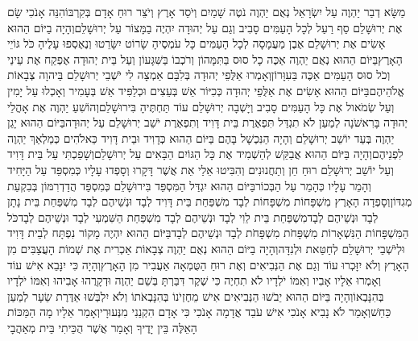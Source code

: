 \documentclass[../main/main.tex]{subfiles}
\begin{document}
\begin{multicols*}{\ncols}
מַשָּׂא דְבַר יַהְוֶה עַל יִשְׂרָאֵל נְאֻם יַהְוֶה נֹטֶה שָׁמַיִם וְיֹסֵד אָרֶץ וְיֹצֵר רוּחַ אָדָם בְּקִרְבּוֹ\PreVerseSpace{}הִנֵּה אָנֹכִי שָׂם אֶת יְרוּשָׁלֵם סַף רַעַל לְכָל הָעַמִּים סָבִיב וְגַם עַל יְהוּדָה יִהְיֶה בַמָּצוֹר עַל יְרוּשָׁלֵם\PreVerseSpace{}וְהָיָה בַיּוֹם הַהוּא אָשִׂים אֶת יְרוּשָׁלֵם אֶבֶן מַעֲמָסָה לְכָל הָעַמִּים כָּל עֹמְסֶיהָ שָׂרוֹט יִשָּׂרֵטוּ וְנֶאֶסְפוּ עָלֶיהָ כֹּל גּוֹיֵי הָאָרֶץ\PreVerseSpace{}בַּיּוֹם הַהוּא נְאֻם יַהְוֶה אַכֶּה כָל סוּס בַּתִּמָּהוֹן וְרֹכְבוֹ בַּשִּׁגָּעוֹן וְעַל בֵּית יְהוּדָה אֶפְקַח אֶת עֵינַי וְכֹל סוּס הָעַמִּים אַכֶּה בַּעִוָּרוֹן\PreVerseSpace{}וְאָמְרוּ אַלֻּפֵי יְהוּדָה בְּלִבָּם אַמְצָה לִי יֹשְׁבֵי יְרוּשָׁלֵם בַּיהוָה צְבָאוֹת אֱלֹהֵיהֶם\PreVerseSpace{}בַּיּוֹם הַהוּא אָשִׂים אֶת אַלֻּפֵי יְהוּדָה כְּכִיּוֹר אֵשׁ בְּעֵצִים וּכְלַפִּיד אֵשׁ בְּעָמִיר וְאָכְלוּ עַל יָמִין וְעַל שְׂמֹאול אֶת כָּל הָעַמִּים סָבִיב וְיָשְׁבָה יְרוּשָׁלֵם עוֹד תַּחְתֶּיהָ בִּירוּשָׁלֵם\PreVerseSpace{}וְהוֹשִׁעַ יַהְוֶה אֶת אָהֳלֵי יְהוּדָה בָּרִאשֹׁנָה לְמַעַן לֹא תִגְדַּל תִּפְאֶרֶת בֵּית דָּוִיד וְתִפְאֶרֶת יֹשֵׁב יְרוּשָׁלֵם עַל יְהוּדָה\PreVerseSpace{}בַּיּוֹם הַהוּא יָגֵן יַהְוֶה בְּעַד יוֹשֵׁב יְרוּשָׁלֵם וְהָיָה הַנִּכְשָׁל בָּהֶם בַּיּוֹם הַהוּא כְּדָוִיד וּבֵית דָּוִיד כֵּאלֹהִים כְּמַלְאַךְ יַהְוֶה לִפְנֵיהֶם\PreVerseSpace{}וְהָיָה בַּיּוֹם הַהוּא אֲבַקֵּשׁ לְהַשְׁמִיד אֶת כָּל הַגּוֹיִם הַבָּאִים עַל יְרוּשָׁלֵם\PreVerseSpace{}וְשָׁפַכְתִּי עַל בֵּית דָּוִיד וְעַל יוֹשֵׁב יְרוּשָׁלֵם רוּחַ חֵן וְתַחֲנוּנִים וְהִבִּיטוּ אֵלַי אֵת אֲשֶׁר דָּקָרוּ וְסָפְדוּ עָלָיו כְּמִסְפֵּד עַל הַיָּחִיד וְהָמֵר עָלָיו כְּהָמֵר עַל הַבְּכוֹר\PreVerseSpace{}בַּיּוֹם הַהוּא יִגְדַּל הַמִּסְפֵּד בִּירוּשָׁלֵם כְּמִסְפַּד הֲדַדְרִמּוֹן\SubEnd{} בְּבִקְעַת מְגִדּוֹן\PreVerseSpace{}וְסָפְדָה הָאָרֶץ מִשְׁפָּחוֹת מִשְׁפָּחוֹת לְבָד מִשְׁפַּחַת בֵּית דָּוִיד לְבָד וּנְשֵׁיהֶם לְבָד מִשְׁפַּחַת בֵּית נָתָן לְבָד וּנְשֵׁיהֶם לְבָד\PreVerseSpace{}מִשְׁפַּחַת בֵּית לֵוִי לְבָד וּנְשֵׁיהֶם לְבָד מִשְׁפַּחַת הַשִּׁמְעִי לְבָד וּנְשֵׁיהֶם לְבָד\PreVerseSpace{}כֹּל הַמִּשְׁפָּחוֹת הַנִּשְׁאָרוֹת מִשְׁפָּחֹת מִשְׁפָּחֹת לְבָד וּנְשֵׁיהֶם לְבָד\PreChapterSpace{}בַּיּוֹם הַהוּא יִהְיֶה מָקוֹר נִפְתָּח לְבֵית דָּוִיד וּלְיֹשְׁבֵי יְרוּשָׁלֵם לְחַטַּאת וּלְנִדָּה\PreVerseSpace{}וְהָיָה בַיּוֹם הַהוּא נְאֻם יַהְוֶה צְבָאוֹת אַכְרִית אֶת שְׁמוֹת הָעֲצַבִּים מִן הָאָרֶץ וְלֹא יִזָּכְרוּ עוֹד וְגַם אֶת הַנְּבִיאִים וְאֶת רוּחַ הַטֻּמְאָה אַעֲבִיר מִן הָאָרֶץ\PreVerseSpace{}וְהָיָה כִּי יִנָּבֵא אִישׁ עוֹד וְאָמְרוּ אֵלָיו אָבִיו וְאִמּוֹ יֹלְדָיו לֹא תִחְיֶה כִּי שֶׁקֶר דִּבַּרְתָּ בְּשֵׁם יַהְוֶה וּדְקָרֻהוּ אָבִיהוּ וְאִמּוֹ יֹלְדָיו בְּהִנָּבְאוֹ\PreVerseSpace{}וְהָיָה בַּיּוֹם הַהוּא יֵבֹשׁוּ הַנְּבִיאִים אִישׁ מֵחֶזְיֹנוֹ בְּהִנָּבְאֹתוֹ וְלֹא יִלְבְּשׁוּ אַדֶּרֶת שֵׂעָר לְמַעַן כַּחֵשׁ\PreVerseSpace{}וְאָמַר לֹא נָבִיא אָנֹכִי אִישׁ עֹבֵד אֲדָמָה אָנֹכִי כִּי אָדָם הִקְנַנִי מִנְּעוּרָי\PreVerseSpace{}וְאָמַר אֵלָיו מָה הַמַּכּוֹת הָאֵלֶּה בֵּין יָדֶיךָ וְאָמַר אֲשֶׁר הֻכֵּיתִי בֵּית מְאַהֲבָי\OpenSection{}\par

\end{multicols*}
\end{document}
